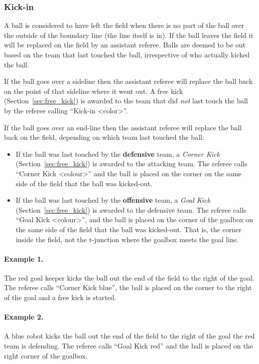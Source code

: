 \subsubsection{Kick-in}
\label{sec:kick_in}
A ball is considered to have left the field when there is no part of the ball over the outside of the boundary line (\ie the line itself is in). If the ball leaves the field it will be replaced on the field by an assistant referee. Balls are deemed to be out based on the team that last touched the ball, irrespective of who actually kicked the ball.

If the ball goes over a sideline then the assistant referee will replace the ball back on the point of that sideline where it went out. A free kick (\cf Section~\ref{sec:free_kick}) is awarded to the team that did \emph{not} last touch the ball by the referee calling ``Kick-in \textless color\textgreater''.

If the ball goes over an end-line then the assistant referee will replace the ball back on the field, depending on which team last touched the ball:
\begin{itemize}
\item If the ball was last touched by the \textbf{defensive} team, a \emph{Corner Kick} (\cf Section~\ref{sec:free_kick}) is awarded to the attacking team. The referee calls ``Corner Kick \textless colour\textgreater'' and the ball is placed on the corner on the same side of the field that the ball was kicked-out.
\item If the ball was last touched by the \textbf{offensive} team, a \emph{Goal Kick} (\cf Section~\ref{sec:free_kick}) is awarded to the defensive team. The referee calls ``Goal Kick \textless colour\textgreater'', and the ball is placed on the corner of the goalbox on the same side of the field that the ball was kicked-out. That is, the corner inside the field, not the t-junction where the goalbox meets the goal line.
\end{itemize}

\paragraph{Example 1.} The red goal keeper kicks the ball out the end of the field to the right of the goal. The referee calls ``Corner Kick blue'', the ball is placed on the corner to the right of the goal and a free kick is started.

\paragraph{Example 2.} A blue robot kicks the ball out the end of the field to the right of the goal the red team is defending. The referee calls ``Goal Kick red'' and the ball is placed on the right corner of the goalbox.

